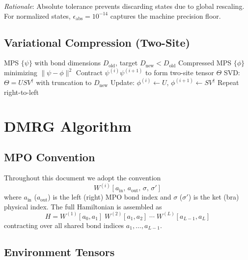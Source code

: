 \documentclass[aps,prb,onecolumn,scriptaddress]{revtex4-2}
\newcommand{\eps}{\epsilon}
\begin{document}
	\textit{Rationale}: Absolute tolerance prevents discarding states due to
	global rescaling. For normalized states, $\eps_{\text{abs}} = 10^{-14}$
	captures the machine precision floor.
	
	\subsection{Variational Compression (Two-Site)}
	\begin{algorithm}[H]
		\caption{VariationalCompress}
		\begin{algorithmic}[1]
			\Require MPS $\{\psi\}$ with bond dimensions $D_{\text{old}}$,
			target $D_{\text{new}} < D_{\text{old}}$
			\Ensure Compressed MPS $\{\phi\}$ minimizing $\|\psi - \phi\|^2$
			\State Contract $\psi^{(i)}\psi^{(i+1)}$ to form two-site tensor $\Theta$
			\State SVD: $\Theta = U S V^\dagger$ with truncation to $D_{\text{new}}$
			\State Update: $\phi^{(i)} \gets U$, $\phi^{(i+1)} \gets S V^\dagger$
			\EndFor
			\State Repeat right-to-left
			\EndFor
		\end{algorithmic}
	\end{algorithm}
	
	\clearpage
	\section{DMRG Algorithm}
	
	\subsection{MPO Convention}
	
	Throughout this document we adopt the convention
	\begin{equation}
		W^{(i)}[a_{\text{in}},\, a_{\text{out}},\, \sigma,\, \sigma']
	\end{equation}
	where $a_{\text{in}}$ ($a_{\text{out}}$) is the left (right) MPO bond index
	and $\sigma$ ($\sigma'$) is the ket (bra) physical index.
	The full Hamiltonian is assembled as
	\begin{equation}
		H = W^{(1)}[a_0, a_1]\; W^{(2)}[a_1, a_2]\;\cdots\; W^{(L)}[a_{L-1}, a_L]
	\end{equation}
	contracting over all shared bond indices $a_1, \dots, a_{L-1}$.
	
	\subsection{Environment Tensors}
	
\end{document}
